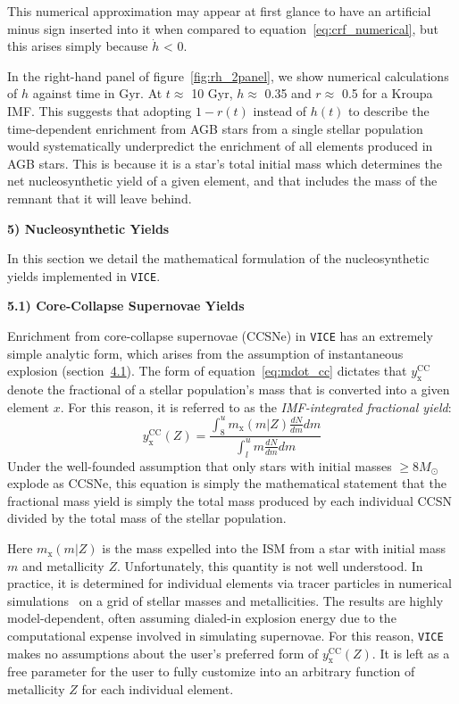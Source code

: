 \documentclass{report}
\newcommand\ddfrac[2]{\frac{\displaystyle #1}{\displaystyle #2}}
\begin{document}
This numerical approximation may appear at first glance to have an artificial 
minus sign inserted into it when compared to equation~\ref{eq:crf_numerical},  
but this arises simply because $\dot{h}$ < 0. 
\par
In the right-hand panel of figure~\ref{fig:rh_2panel}, we show numerical 
calculations of $h$ against time in Gyr. At $t \approx$ 10 Gyr, $h \approx$ 
0.35 and $r \approx$ 0.5 for a Kroupa IMF. This suggests that adopting 
$1 - r(t)$ instead of $h(t)$ to describe the time-dependent enrichment from 
AGB stars from a single stellar population would systematically underpredict 
the enrichment of all elements produced in AGB stars. This is because it is a 
star's total initial mass which determines the net nucleosynthetic yield of a 
given element, and that includes the mass of the remnant that it will leave 
behind. 
\par



\null\par\noindent
\hypertarget{sec:yields}{\textbf{5) Nucleosynthetic Yields}} \par\noindent
In this section we detail the mathematical formulation of the nucleosynthetic 
yields implemented in \texttt{VICE}. 

\null\par\noindent
\hypertarget{sec:ccsne_yields}{\textbf{5.1) Core-Collapse Supernovae Yields}}
\par\noindent 
Enrichment from core-collapse supernovae (CCSNe) in \texttt{VICE} has an 
extremely simple analytic form, which arises from the assumption of 
instantaneous explosion (section~\hyperlink{sec:ccsne}{4.1}). The form of 
equation~\ref{eq:mdot_cc} dictates that $y_\text{x}^\text{CC}$ denote the 
fractional of a stellar population's mass that is converted into a given 
element $x$. For this reason, it is referred to as the \textit{IMF-integrated 
fractional yield}: 
\begin{equation}
y_\text{x}^\text{CC}(Z) = \ddfrac{
	\int_8^u m_\text{x}(m | Z)\frac{dN}{dm}dm
}{
	\int_l^u m\frac{dN}{dm}dm
}
\end{equation}
Under the well-founded assumption that only stars with initial masses 
$\geq 8 M_\odot$ explode as CCSNe, this equation is simply the mathematical 
statement that the fractional mass yield is simply the total mass produced by 
each individual CCSN divided by the total mass of the stellar population. 
\par
Here $m_\text{x}(m | Z)$ is the mass expelled into the ISM from a star with 
initial mass $m$ and metallicity $Z$. Unfortunately, this quantity is not 
well understood. In practice, it is determined for individual elements via 
tracer particles in numerical simulations~\citep{Woosley1995,Chieffi2004,
Chieffi2013,Limongi2018} on a grid of stellar masses and metallicities. 
The results are highly model-dependent, often assuming dialed-in explosion 
energy due to the computational expense involved in simulating supernovae. 
For this reason, \texttt{VICE} makes no assumptions about the user's 
preferred form of $y_\text{x}^\text{CC}(Z)$. It is left as a free parameter 
for the user to fully customize into an arbitrary function of metallicity 
$Z$ for each individual element. 
\end{document}
